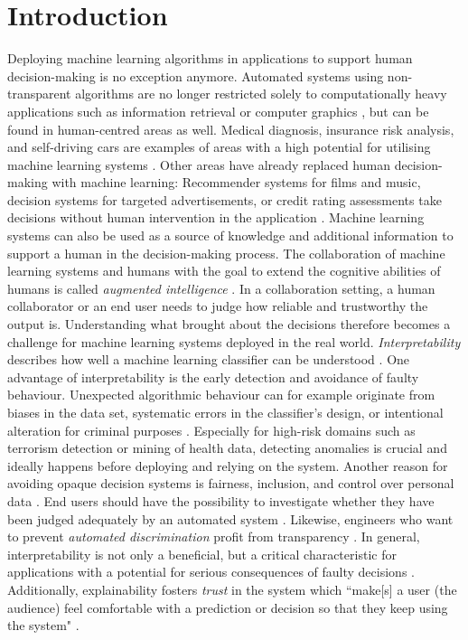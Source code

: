\section{Introduction}
\label{sec:intro}
Deploying machine learning algorithms in applications to support human decision-making is no exception anymore. Automated systems using non-transparent algorithms are no longer restricted solely to computationally heavy applications such as information retrieval or computer graphics \cite{liu2017towards}, but can be found in human-centred areas as well. Medical diagnosis, insurance risk analysis, and self-driving cars are examples of areas with a high potential for utilising machine learning systems \cite{guidotti2018survey}. Other areas have already replaced human decision-making with machine learning: Recommender systems for films and music, decision systems for targeted advertisements, or credit rating assessments take decisions without human intervention in the application \cite{gilpin2018explaining}. Machine learning systems can also be used as a source of knowledge and additional information to support a human in the decision-making process. The collaboration of machine learning systems and humans with the goal to extend the cognitive abilities of humans is called \textit{augmented intelligence} \cite{ventocilla2018taxonomy}.\newline
In a collaboration setting, a human collaborator or an end user needs to judge how reliable and trustworthy the output is. Understanding what brought about the decisions therefore becomes a challenge for machine learning systems deployed in the real world. \textit{Interpretability} describes how well a machine learning classifier can be understood \cite{kotsiantis2007supervised}. One advantage of interpretability is the early detection and avoidance of faulty behaviour. Unexpected algorithmic behaviour can for example originate from biases in the data set, systematic errors in the classifier's design, or intentional alteration for criminal purposes \cite{gilpin2018explaining}. Especially for high-risk domains such as terrorism detection or mining of health data, detecting anomalies is crucial \cite{ribeiro2016should} and ideally happens before deploying and relying on the system. Another reason for avoiding opaque decision systems is fairness, inclusion, and control over personal data \cite{diakopoulos2016accountability, gilpin2018explaining, goodman16eu}. End users should have the possibility to investigate whether they have been judged adequately by an automated system \cite{selbst2017meaningful}. Likewise, engineers who want to prevent \textit{automated discrimination} profit from transparency \cite{ribeiro2016should, richardson2018survey}. In general, interpretability is not only a beneficial, but a critical characteristic for applications with a potential for serious consequences of faulty decisions \cite{richardson2018survey}. Additionally, explainability fosters \textit{trust} in the system  \cite{biran2017explanation, cramer2008effects, diakopoulos2016accountability, preece2018asking, vorm2018assessing} which ``make[s] a user (the audience) feel comfortable with a prediction or decision so that they keep using the system" \cite{van2001perceived}.\newline
